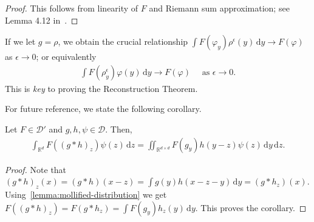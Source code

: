 \begin{proof}
    This follows from linearity of \(F\) and Riemann sum approximation; see Lemma 4.12 in~\cite{JanKristensenDistribution}.
\end{proof}

If we let \(g = {\rho}\), we obtain the crucial relationship \(\int F(\varphi_y)\rho^{\epsilon}(y) \, \mathrm{d}y \to F(\varphi)\) as \(\epsilon \to 0\); or equivalently
\begin{align}\label{eq:starting-point}
    \int F(\rho_y^\epsilon) \varphi(y)\, \mathrm{d}y \to F(\varphi) \quad \text{ as } \epsilon \to 0.
\end{align}
This is \emph{key} to proving the Reconstruction Theorem. 

For future reference, we state the following corollary.
\begin{corollary}\label{cor:minosokoad}
    Let \(F \in \mathcal{D}'\) and \(g,h, \psi \in \mathcal{D}\). Then, 
    \begin{align*}
        \int_{\mathbb{R}^d} F({(g*h)}_z) \psi(z)\, \mathrm{d}z
    = \iint_{\mathbb{R}^{d \times d}} F(g_y)  h(y-z) \psi(z) \, \mathrm{d}y\, \mathrm{d}z.
    \end{align*}
\end{corollary}

\begin{proof}
    Note that \({(g*h)}_z(x) = (g*h)(x - z) = \int g(y)h(x-z-y) \, \mathrm{d}y = (g*h_z)(x)\). Using~\eqref{lemma:mollified-distribution} we get \(F({(g*h)}_z) = F(g*h_z) = \int F(g_y) h_z(y) \, \mathrm{d}y\). This proves the corollary.
\end{proof}
